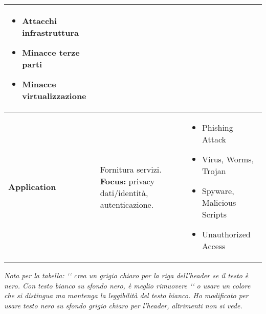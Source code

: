 \documentclass{article}
\begin{document}
\begin{table}[H]
\begin{tabular}{|p{}|p{}|p{}|}
\begin{itemize}[nosep, leftmargin=*, itemsep=-2pt, before=\vspace{-0.5\baselineskip}, after=\vspace{-\baselineskip}]
        \item Attacchi infrastruttura
        \item Minacce terze parti
        \item Minacce virtualizzazione
    \end{itemize} \\
\hline
\textbf{Application} & Fornitura servizi. \newline \textbf{Focus:} privacy dati/identità, autenticazione. &
    \begin{itemize}[nosep, leftmargin=*, itemsep=-2pt, before=\vspace{-0.5\baselineskip}, after=\vspace{-\baselineskip}]
        \item Phishing Attack
        \item Virus, Worms, Trojan
        \item Spyware, Malicious Scripts
        \item Unauthorized Access
    \end{itemize} \\
\hline
\end{tabular}
\end{table}
\textit{Nota per la tabella: `` crea un grigio chiaro per la riga dell'header se il testo è nero. Con testo bianco su sfondo nero, è meglio rimuovere `\rowcolor` o usare un colore che si distingua ma mantenga la leggibilità del testo bianco. Ho modificato per usare testo nero su sfondo grigio chiaro per l'header, altrimenti non si vede.}
\end{document}
